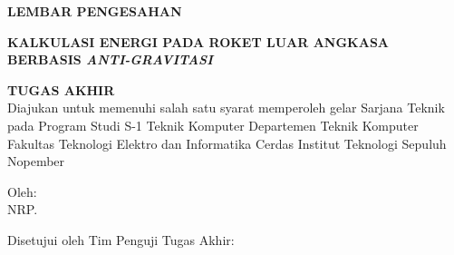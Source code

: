 \begin{center}
  \large
  \textbf{LEMBAR PENGESAHAN}
\end{center}

\thispagestyle{empty}

\begin{center}
  \textbf{KALKULASI ENERGI PADA ROKET LUAR ANGKASA BERBASIS \emph{ANTI-GRAVITASI}}
\end{center}

\begingroup
\small


\begin{center}
  \textbf{TUGAS AKHIR}
  \\Diajukan untuk memenuhi salah satu syarat memperoleh gelar Sarjana Teknik pada Program Studi S-1 Teknik Komputer Departemen Teknik Komputer Fakultas Teknologi Elektro dan Informatika Cerdas Institut Teknologi Sepuluh Nopember
\end{center}


\begin{center}
  Oleh: \name{}
  \\NRP. \nrp{}
\end{center}



\begin{center}
  Disetujui oleh Tim Penguji Tugas Akhir:
\end{center}


\begingroup
\setlength{\tabcolsep}{0pt}

